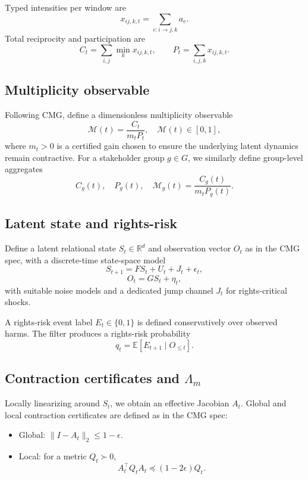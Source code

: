 \documentclass[11pt]{article}
\begin{document}
Typed intensities per window are
\[
x_{ij,k,t} = \sum_{e:i\to j,k} a_e.
\]
Total reciprocity and participation are
\[
C_t = \sum_{i,j} \min_k x_{ij,k,t}, \qquad
P_t = \sum_{i,j,k} x_{ij,k,t}.
\]

\subsection{Multiplicity observable}

Following CMG, define a dimensionless multiplicity observable
\[
\mathcal{M}(t) = \frac{C_t}{m_t P_t}, \quad \mathcal{M}(t) \in [0,1],
\]
where \(m_t>0\) is a certified gain chosen to ensure the underlying latent dynamics remain contractive.\cite{cmg-spec}
For a stakeholder group \(g \in G\), we similarly define group-level aggregates
\[
C_g(t), \quad P_g(t), \quad \mathcal{M}_g(t) = \frac{C_g(t)}{m_t P_g(t)}.
\]

\subsection{Latent state and rights-risk}

Define a latent relational state \(S_t \in \mathbb{R}^d\) and observation vector \(O_t\) as in the CMG spec, with a discrete-time state-space model
\[
S_{t+1} = F S_t + U_t + J_t + \epsilon_t,
\]
\[
O_t = G S_t + \eta_t,
\]
with suitable noise models and a dedicated jump channel \(J_t\) for rights-critical shocks.\cite{cmg-spec}

A rights-risk event label \(E_t \in \{0,1\}\) is defined conservatively over observed harms.
The filter produces a rights-risk probability
\[
q_t = \mathbb{E}[E_{t+1} \mid O_{\le t}].
\]

\subsection{Contraction certificates and \texorpdfstring{\(\Lambda_m\)}{Lambda\_m}}

Locally linearizing around \(S_t\), we obtain an effective Jacobian \(A_t\).
Global and local contraction certificates are defined as in the CMG spec:

\begin{itemize}[leftmargin=*]
  \item Global: \(\|I - A_t\|_2 \le 1 - \epsilon\).
  \item Local: for a metric \(Q_t \succ 0\),
  \[
  A_t^\top Q_t A_t \preceq (1-2\epsilon) Q_t.
  \]
\end{itemize}
\end{document}
